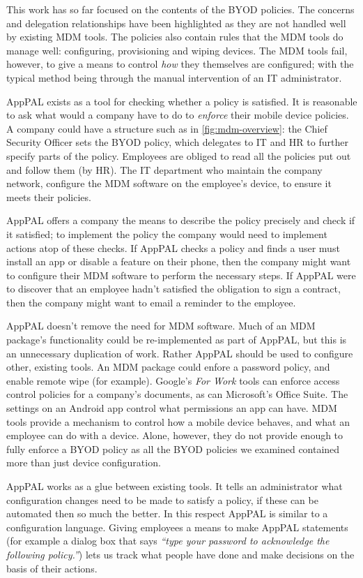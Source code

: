\documentclass[thesis.tex]{subfiles}
\begin{document}
This work has so far focused on the contents of the BYOD policies.
The concerns and delegation relationships have been highlighted as
they are not handled well by existing \ac{MDM} tools.  The policies
also contain rules that the \ac{MDM} tools do manage well:
configuring, provisioning and wiping devices.  The \ac{MDM} tools
fail, however, to give a means to control \emph{how} they themselves
are configured; with the typical method being through the manual
intervention of an IT administrator.

AppPAL exists as a tool for checking whether a policy is satisfied.
It is reasonable to ask what would a company have to do to
\emph{enforce} their mobile device policies. A company could have a
structure such as in \autoref{fig:mdm-overview}: the Chief Security
Officer sets the BYOD policy, which delegates to IT and HR to further
specify parts of the policy.  Employees are obliged to read all the
policies put out and follow them (by HR).  The IT department who
maintain the company network, configure the \ac{MDM} software on the
employee's device, to ensure it meets their policies.

AppPAL offers a company the means to describe the policy precisely and
check if it satisfied; to
implement the policy the company would need to implement actions atop
of these checks.  If AppPAL checks a policy and finds a user must
install an app or disable a feature on their phone, then the company
might want to configure their \ac{MDM} software to perform the
necessary steps.  If AppPAL were to discover that an employee hadn't
satisfied the obligation to sign a contract, then the company might
want to email a reminder to the employee.

AppPAL doesn't remove the need for \ac{MDM} software.  Much of an
\ac{MDM} package's functionality could be re-implemented as part of
AppPAL, but this is an unnecessary duplication of work.  Rather AppPAL
should be used to configure other, existing tools.  An \ac{MDM}
package could enfore a password policy, and enable remote wipe (for
example).  Google's \emph{For Work} tools can enforce access control
policies for a company's documents, as can Microsoft's Office Suite.
The settings on an Android app control what permissions an app can
have.  \ac{MDM} tools provide a mechanism to control how a mobile
device behaves, and what an employee can do with a device.  Alone,
however, they do not provide enough to fully enforce a \ac{BYOD}
policy as all the \ac{BYOD} policies we examined contained more than
just device configuration.

AppPAL works as a glue between existing tools.  It tells an
administrator what configuration changes need to be made to satisfy a
policy, if these can be automated then so much the better.  In this
respect AppPAL is similar to a configuration language.  Giving
employees a means to make AppPAL statements (for example a dialog box
that says \emph{``type your password to acknowledge the following
policy.''}) lets us track what people have done and make decisions on
the basis of their actions.

%  
\end{document}
